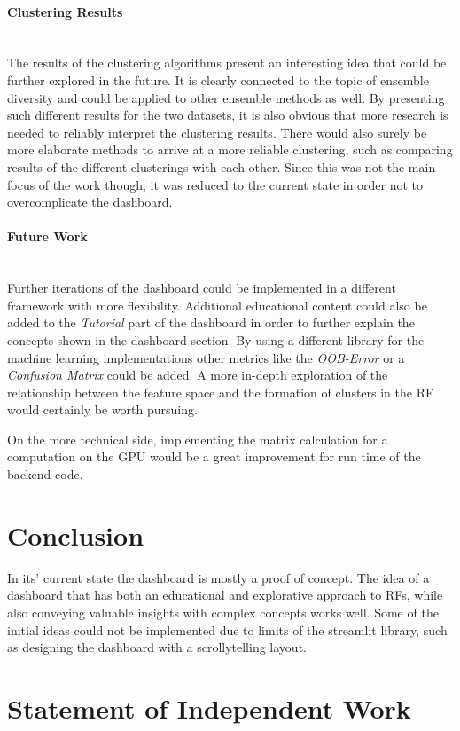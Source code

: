 \documentclass[a4paper, 12pt]{article}
\begin{document}
\paragraph{Clustering Results}\mbox{}\\
The results of the clustering algorithms present an interesting idea that could be further explored in the
future. It is clearly connected to the topic of ensemble diversity and could be applied to other ensemble
methods as well. By presenting such different results for the two datasets, it is also obvious that more
research is needed to reliably interpret the clustering results. There would also surely be more elaborate
methods to arrive at a more reliable clustering, such as comparing results of the different clusterings
with each other. Since this was not the main focus of the work though, it was reduced to the current state
in order not to overcomplicate the dashboard.

\paragraph{Future Work}\mbox{}\\
Further iterations of the dashboard could be implemented in a different framework with more flexibility.
Additional educational content could also be added to the \textit{Tutorial} part of the dashboard in order to
further explain the concepts shown in the dashboard section. By using a different library for the machine
learning implementations other metrics like the \textit{OOB-Error} or a \textit{Confusion Matrix} could be
added. A more in-depth exploration of the relationship between the feature space and the formation of clusters
in the RF would certainly be worth pursuing. \par
On the more technical side, implementing the matrix calculation for a computation on the GPU would be a great
improvement for run time of the backend code.

\clearpage
\section{Conclusion}
In its' current state the dashboard is mostly a proof of concept. The idea of a dashboard that has both
an educational and explorative approach to RFs, while also conveying valuable insights with complex concepts
works well. Some of the initial ideas could not be implemented due to limits of the streamlit library, such
as designing the dashboard with a scrollytelling layout.

\clearpage
\section{Statement of Independent Work}

\clearpage


\end{document}
